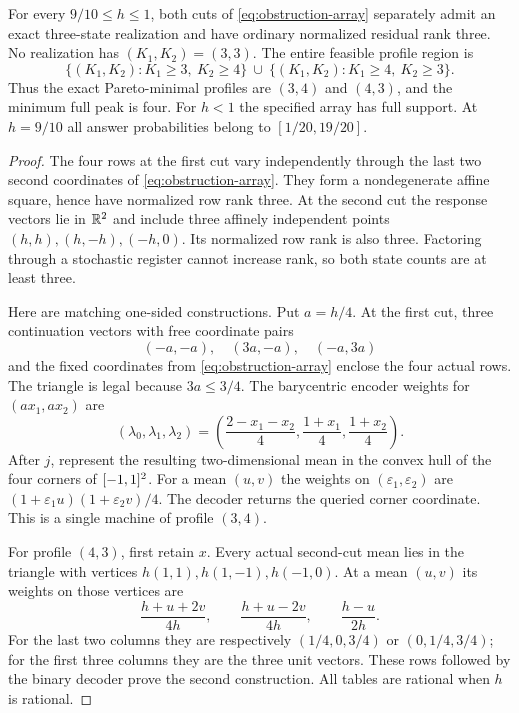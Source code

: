\begin{theorem}
\label{thm:obstruction}
For every $9/10\le h\le1$, both cuts of \eqref{eq:obstruction-array}
separately admit an exact three-state realization and have ordinary
normalized residual rank three. No realization has $(K_1,K_2)=(3,3)$.
The entire feasible profile region is
\begin{equation}\label{eq:pareto}
 \{(K_1,K_2):K_1\ge3,\ K_2\ge4\}
 \ \cup\ \{(K_1,K_2):K_1\ge4,\ K_2\ge3\}.
\end{equation}
Thus the exact Pareto-minimal profiles are $(3,4)$ and $(4,3)$, and the
minimum full peak is four. For $h<1$ the specified array has full
support. At $h=9/10$ all answer probabilities belong to
$[1/20,19/20]$.
\end{theorem}
\begin{proof}
The four rows at the first cut vary independently through the last two
second coordinates of \eqref{eq:obstruction-array}. They form a
nondegenerate affine square, hence have normalized row rank three. At
the second cut the response vectors lie in $\mathbb R^2$ and include three
affinely independent points $(h,h),(h,-h),(-h,0)$. Its normalized row
rank is also three. Factoring through a stochastic register cannot
increase rank, so both state counts are at least three.

Here are matching one-sided constructions. Put $a=h/4$. At the first
cut, three continuation vectors with free coordinate pairs
\begin{equation}\label{eq:parent-triangle}
                (-a,-a),\quad(3a,-a),\quad(-a,3a)
\end{equation}
and the fixed coordinates from \eqref{eq:obstruction-array} enclose the
four actual rows. The triangle is legal because $3a\le3/4$. The
barycentric encoder weights for $(ax_1,ax_2)$ are
\[
 (\lambda_0,\lambda_1,\lambda_2)
   =\left(\frac{2-x_1-x_2}{4},\frac{1+x_1}{4},\frac{1+x_2}{4}\right).
\]
After $j$, represent the resulting two-dimensional mean in the convex
hull of the four corners of $[-1,1]^2$. For a mean $(u,v)$ the weights
on $(\varepsilon_1,\varepsilon_2)$ are
$(1+\varepsilon_1u)(1+\varepsilon_2v)/4$. The decoder returns the
queried corner coordinate. This is a single machine of profile $(3,4)$.

For profile $(4,3)$, first retain $x$. Every actual second-cut mean lies
in the triangle with vertices $h(1,1),h(1,-1),h(-1,0)$. At a mean
$(u,v)$ its weights on those vertices are
\begin{equation}\label{eq:child-triangle-weights}
 \frac{h+u+2v}{4h},\qquad\frac{h+u-2v}{4h},\qquad\frac{h-u}{2h}.
\end{equation}
For the last two columns they are respectively $(1/4,0,3/4)$ or
$(0,1/4,3/4)$; for the first three columns they are the three unit
vectors. These rows followed by the binary decoder prove the second
construction. All tables are rational when $h$ is rational.


\end{proof}
